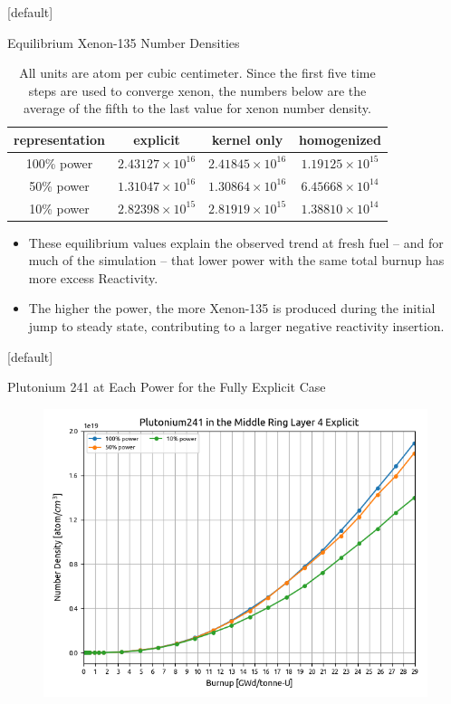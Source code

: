 \documentclass[9pt,t,aspectratio=169]{beamer}
\makeatletter
\newenvironment{withoutheadline}{
       \setbeamertemplate{headline}[default]
       \def\beamer@entrycode{\vspace*{-\headheight}}
    }{}
\makeatother
\begin{document}
\begin{withoutheadline}
\begin{frame}{Equilibrium Xenon-135 Number Densities}
    \LARGE
    \begin{table}
        \centering
        \caption{All units are atom per cubic centimeter. Since the first five time steps are used to converge xenon, the numbers below are the average of the fifth to the last value for xenon number density.}
        \begin{tabular}{|c|c|c|c|} \hline
        representation & explicit & kernel only & homogenized \\ \hline
        100\% power & $2.43127\times 10^{16}$ & $2.41845\times 10^{16}$ & $1.19125\times 10^{15}$ \\  \hline
        50\% power & $1.31047\times 10^{16}$ & $1.30864\times 10^{16}$ & $6.45668\times 10^{14}$ \\ \hline
        10\% power & $2.82398\times 10^{15}$ & $2.81919\times 10^{15}$ & $1.38810\times 10^{14}$ \\ \hline
        \end{tabular}
        \label{tab:xenons}
    \end{table}
    \begin{itemize}
        \item These equilibrium values explain the observed trend at fresh fuel -- and for much of the simulation -- that lower power with the same total burnup has more excess Reactivity.
        \item The higher the power, the more Xenon-135 is produced during the initial jump to steady state, contributing to a larger negative reactivity insertion.
    \end{itemize}
\end{frame}

\begin{withoutheadline}
\begin{frame}{Plutonium 241 at Each Power for the Fully Explicit Case}
    \begin{figure}
        \vspace*{-0.4cm}
        \centering
            \includegraphics[height=0.9\textheight]{figures/explicit_Pu_241.png}
    \end{figure}
\end{frame}
\end{withoutheadline}
\end{document}
